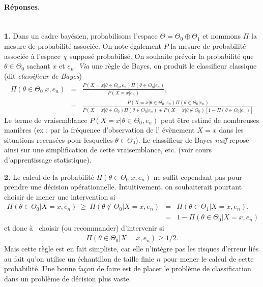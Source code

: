 \paragraph{\bf Réponses.} \\
{\bf 1.} Dans un cadre bayésien, probabilisons l'espace $\Theta= \Theta_0 \oplus \Theta_1$ et nommons $\Pi$ la mesure de probabilité associée. On note également $P$ la mesure de probabilité associée à l'espace $\chi$ supposé probabilisé. On souhaite prévoir la probabilité que $\theta\in\Theta_0$ sachant $x$ et $e_n$. {\it Via} une règle de Bayes, on produit le classifieur classique (dit {\it classifieur de Bayes})
\begin{eqnarray*}
\Pi(\theta\in\Theta_0|x,e_n) & = & \frac{P(X=x|\theta\in\Theta_0,e_n)\Pi(\theta\in\Theta_0|e_n)}{P(X=x|e_n)}, \\
& = & \frac{P(X=x|\theta\in\Theta_0,e_n)\Pi(\theta\in\Theta_0|e_n)}{P(X=x|\theta\in\Theta_0)\Pi(\theta\in\Theta_0|e_n) + P(X=x|\theta\notin\Theta_0)\left[1-\Pi(\theta\in\Theta_0|e_n)\right]}
\end{eqnarray*} 
Le terme de vraisemblance $P(X=x|\theta\in\Theta_0,e_n)$ peut être estimé de nombreuses manières (ex : par  la fréquence d'observation de l' évènement $X=x$ dans les situations recensées pour lesquelles $\theta\in\Theta_0$). Le classifieur de Bayes {\it naïf} repose ainsi sur une simplification de cette vraisemblance, etc. (voir cours d'apprentissage statistique). \\

\vspace{1cm}

{\bf 2.}  Le calcul de la probabilité $\Pi(\theta\in\Theta_0|x,e_n)$ ne suffit cependant pas pour prendre une décision opérationnelle. Intuitivement, on souhaiterait pourtant choisir de mener une intervention si
\begin{eqnarray*}
\Pi(\theta\in\Theta_0|X=x,e_n) \ \geq \  \Pi(\theta\notin\Theta_0|X=x,e_n) & = & \Pi(\theta\in\Theta_1|X=x,e_n), \\
& = & 1 - \Pi(\theta\in\Theta_0|X=x,e_n)
\end{eqnarray*}
et donc à  choisir (ou recommander) d'intervenir si
\begin{eqnarray}
\Pi(\theta\in\Theta_0|X=x,e_n) \geq 1/2. \label{regle.simpliste}
\end{eqnarray}
Mais cette règle est en fait simpliste, car elle n'intègre pas les risques d'erreur liés au fait qu'on utilise un échantillon de taille finie $n$ pour mener le calcul de cette probabilité. Une bonne fa\c con de faire est de placer le problème de classification dans un problème de décision plus vaste. \\

